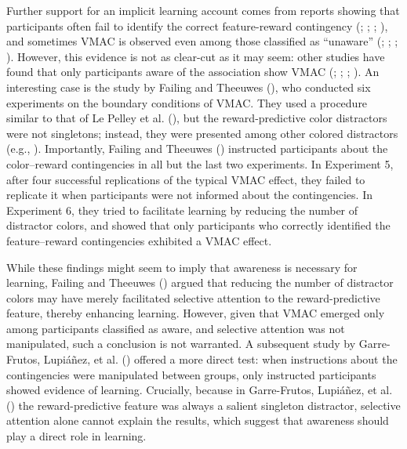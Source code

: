\documentclass[
  man,
  floatsintext,
  longtable,
  nolmodern,
  notxfonts,
  notimes,
  mask,
  colorlinks=true,linkcolor=blue,citecolor=blue,urlcolor=blue]{apa7}
\begin{document}
Further support for an implicit learning account comes from reports
showing that participants often fail to identify the correct
feature-reward contingency (;
;
;
), and
sometimes VMAC is observed even among those classified as ``unaware''
(;
;
;
). However, this
evidence is not as clear-cut as it may seem: other studies have found
that only participants aware of the association show VMAC
(;
;
;
). An interesting case is
the study by Failing and Theeuwes (),
who conducted six experiments on the boundary conditions of VMAC. They
used a procedure similar to that of Le Pelley et al.
(), but the reward-predictive color
distractors were not singletons; instead, they were presented among
other colored distractors (e.g., ). Importantly, Failing and Theeuwes
() instructed participants about the
color--reward contingencies in all but the last two experiments. In
Experiment 5, after four successful replications of the typical VMAC
effect, they failed to replicate it when participants were not informed
about the contingencies. In Experiment 6, they tried to facilitate
learning by reducing the number of distractor colors, and showed that
only participants who correctly identified the feature--reward
contingencies exhibited a VMAC effect.

While these findings might seem to imply that awareness is necessary for
learning, Failing and Theeuwes () argued
that reducing the number of distractor colors may have merely
facilitated selective attention to the reward-predictive feature,
thereby enhancing learning. However, given that VMAC emerged only among
participants classified as aware, and selective attention was not
manipulated, such a conclusion is not warranted. A subsequent study by
Garre-Frutos, Lupiáñez, et al. ()
offered a more direct test: when instructions about the contingencies
were manipulated between groups, only instructed participants showed
evidence of learning. Crucially, because in Garre-Frutos, Lupiáñez, et
al. () the reward-predictive
feature was always a salient singleton distractor, selective attention
alone cannot explain the results, which suggest that awareness should
play a direct role in learning.
\end{document}
